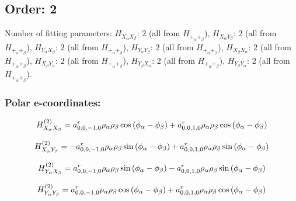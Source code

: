 \documentclass[fleqn]{article}
\begin{document}
\subsection{Order: 2}
Number of fitting parameters: $H_{X_{\alpha}X_{\beta}}$: $2$ (all from $H_{+_{\alpha}+_{\beta}}$), $H_{X_{\alpha}Y_{\beta}}$: $2$ (all from $H_{+_{\alpha}+_{\beta}}$), $H_{Y_{\alpha}X_{\beta}}$: $2$ (all from $H_{+_{\alpha}+_{\beta}}$), $H_{Y_{\alpha}Y_{\beta}}$: $2$ (all from $H_{+_{\alpha}+_{\beta}}$), $H_{X_{\beta}X_{\alpha}}$: $2$ (all from $H_{+_{\alpha}+_{\beta}}$), $H_{X_{\beta}Y_{\alpha}}$: $2$ (all from $H_{+_{\alpha}+_{\beta}}$), $H_{Y_{\beta}X_{\alpha}}$: $2$ (all from $H_{+_{\alpha}+_{\beta}}$), $H_{Y_{\beta}Y_{\alpha}}$: $2$ (all from $H_{+_{\alpha}+_{\beta}}$).
\subsubsection*{Polar e-coordinates:}

\begin{dmath*}
H_{X_{\alpha}X_{\beta}}^{(2)}=a^{r}_{0,0,-1,0} \rho_{\alpha} \rho_{\beta} \cos{\left (\phi_{\alpha} - \phi_{\beta} \right )} + a^{r}_{0,0,1,0} \rho_{\alpha} \rho_{\beta} \cos{\left (\phi_{\alpha} - \phi_{\beta} \right )}\\
\end{dmath*}

\begin{dmath*}
H_{X_{\alpha}Y_{\beta}}^{(2)}=-  a^{r}_{0,0,-1,0} \rho_{\alpha} \rho_{\beta} \sin{\left (\phi_{\alpha} - \phi_{\beta} \right )} +  a^{r}_{0,0,1,0} \rho_{\alpha} \rho_{\beta} \sin{\left (\phi_{\alpha} - \phi_{\beta} \right )}\\
\end{dmath*}

\begin{dmath*}
H_{Y_{\alpha}X_{\beta}}^{(2)}= a^{r}_{0,0,-1,0} \rho_{\alpha} \rho_{\beta} \sin{\left (\phi_{\alpha} - \phi_{\beta} \right )} -  a^{r}_{0,0,1,0} \rho_{\alpha} \rho_{\beta} \sin{\left (\phi_{\alpha} - \phi_{\beta} \right )}\\
\end{dmath*}

\begin{dmath*}
H_{Y_{\alpha}Y_{\beta}}^{(2)}= a^{r}_{0,0,-1,0} \rho_{\alpha} \rho_{\beta} \cos{\left (\phi_{\alpha} - \phi_{\beta} \right )} +  a^{r}_{0,0,1,0} \rho_{\alpha} \rho_{\beta} \cos{\left (\phi_{\alpha} - \phi_{\beta} \right )}\\
\end{dmath*}
\end{document}
